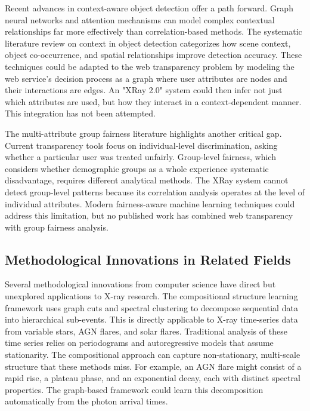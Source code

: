 \documentclass[conference]{IEEEtran}
\begin{document}
Recent advances in context-aware object detection \cite{r9} offer a path forward. Graph neural networks and attention mechanisms can model complex contextual relationships far more effectively than correlation-based methods. The systematic literature review on context in object detection \cite{r9} categorizes how scene context, object co-occurrence, and spatial relationships improve detection accuracy. These techniques could be adapted to the web transparency problem by modeling the web service's decision process as a graph where user attributes are nodes and their interactions are edges. An "XRay 2.0" system could then infer not just which attributes are used, but how they interact in a context-dependent manner. This integration has not been attempted.

The multi-attribute group fairness literature \cite{r10} highlights another critical gap. Current transparency tools focus on individual-level discrimination, asking whether a particular user was treated unfairly. Group-level fairness, which considers whether demographic groups as a whole experience systematic disadvantage, requires different analytical methods. The XRay system cannot detect group-level patterns because its correlation analysis operates at the level of individual attributes. Modern fairness-aware machine learning techniques could address this limitation, but no published work has combined web transparency with group fairness analysis.

\subsection{Methodological Innovations in Related Fields}

Several methodological innovations from computer science have direct but unexplored applications to X-ray research. The compositional structure learning framework \cite{r4,r5} uses graph cuts and spectral clustering to decompose sequential data into hierarchical sub-events. This is directly applicable to X-ray time-series data from variable stars, AGN flares, and solar flares. Traditional analysis of these time series relies on periodograms and autoregressive models that assume stationarity. The compositional approach can capture non-stationary, multi-scale structure that these methods miss. For example, an AGN flare might consist of a rapid rise, a plateau phase, and an exponential decay, each with distinct spectral properties. The graph-based framework could learn this decomposition automatically from the photon arrival times.
\end{document}
